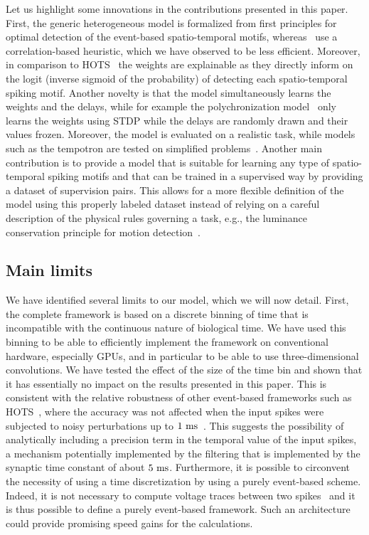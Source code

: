 \documentclass[default]{sn-jnl}%
\theoremstyle{thmstyleone}%
\theoremstyle{thmstyletwo}%
\theoremstyle{thmstylethree}%
\newcommand{\note}[1]{{\sethlcolor{yellow}\hl{#1}}}
\begin{document}
Let us highlight some innovations in the contributions presented in this paper. First, the generic heterogeneous model is formalized from first principles for optimal detection of the event-based spatio-temporal motifs, whereas~\citet{ghosh_spatiotemporal_2019,yu_stsc-snn_2022} use a correlation-based heuristic, which we have observed to be less efficient. Moreover, in comparison to HOTS~\citep{lagorce_hots_2017} the weights are explainable as they directly inform on the logit (inverse sigmoid of the probability) of detecting each spatio-temporal spiking motif. Another novelty is that the model simultaneously learns the weights and the delays, while for example the polychronization model~\citep{izhikevich_polychronization_2006} only learns the weights using STDP while the delays are randomly drawn and their values frozen. Moreover, the model is evaluated on a realistic task, while models such as the tempotron are tested on simplified problems~\citep{gutig_tempotron_2006}. Another main contribution is to provide a model that is suitable for learning any type of spatio-temporal spiking motifs and that can be trained in a supervised way by providing a dataset of supervision pairs. This allows for a more flexible definition of the model using this properly labeled dataset instead of relying on a careful description of the physical rules governing a task, e.g., the luminance conservation principle for motion detection~\citep{benosman_asynchronous_2012, dardelet_event-by-event_2021}.
%
\subsection{Main limits}
We have identified several limits to our model, which we will now detail. First, the complete framework is based on a discrete binning of time that is incompatible with the continuous nature of biological time. We have used this binning to be able to efficiently implement the framework on conventional hardware, especially GPUs, and in particular to be able to use three-dimensional convolutions. We have tested the effect of the size of the time bin and shown that it has essentially no impact on the results presented in this paper. This is consistent with the relative robustness of other event-based frameworks such as HOTS~\citep{lagorce_hots_2017}, where the accuracy was not affected when the input spikes were subjected to noisy perturbations up to $1~\si{\milli\second}$~\citep{grimaldi_robust_2022}. This suggests the possibility of analytically including a precision term in the temporal value of the input spikes, a mechanism potentially implemented by the filtering that is implemented by the synaptic time constant of about $5~\si{\milli\second}$. Furthermore, it is possible to circonvent the necessity of using a time discretization by using a purely event-based scheme. Indeed, it is not necessary to compute voltage traces between two spikes~\citep{hanuschkin_general_2010} and it is thus possible to define a purely event-based framework. Such an architecture could provide promising speed gains for the calculations. %
\end{document}
